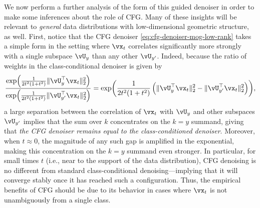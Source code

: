 \documentclass[../../book-main.tex]{subfiles}
\begin{document}
\begin{example}
  We now perform a further analysis of the form of this guided denoiser in
  order to make some inferences about the role of CFG. Many of these insights
  will be relevant to \textit{general} data distributions with low-dimensional
  geometric structure, as well.
  First, notice that the CFG denoiser \eqref{eq:cfg-denoiser-mog-low-rank}
  takes a simple form in the setting where $\vx_t$ correlates significantly more
  strongly with a single subspace $\vU_y$ than any other $\vU_{y'}$. Indeed,
  because the ratio of weights in the class-conditional denoiser is given by
  \begin{equation}
    \frac{
      \exp\rp{\frac{1}{2t^{2}(1 + t^{2})}\norm{\vU_{y}^{\top}\vx_t}_{2}^{2}}
    }{
      \exp\rp{\frac{1}{2t^{2}(1 + t^{2})}\norm{\vU_{y'}^{\top}\vx_t}_{2}^{2}}
    }
    =
    \exp\rp{
      \frac{1}{2t^{2}(1 + t^{2})}\left(
      \norm{\vU_{y}^{\top}\vx_t}_{2}^{2}
      -
      \norm{\vU_{y'}^{\top}\vx_t}_{2}^{2}
      \right)
    },
  \end{equation}
  a large separation between the correlation of $\vx_t$ with $\vU_{y}$ and other
  subspaces $\vU_{y'}$ implies that the sum over $k$ concentrates on the $k=y$
  summand, giving that \textit{the CFG denoiser remains equal to the
  class-conditioned denoiser}. Moreover, when $t \approx 0$, the magnitude of
  any such gap is amplified in the exponential, making this concentration on the
  $k=y$ summand even stronger. In particular, for small times $t$ (i.e., near to
  the support of the data distribution), CFG denoising is no different from
  standard class-conditional denoising---implying that it will converge stably
  once it has reached such a configuration.
  Thus, the empirical benefits of CFG should be due to its behavior in cases
  where $\vx_t$ is not unambiguously from a single class.


\end{example}
\end{document}
